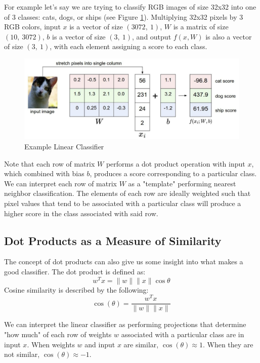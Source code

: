 \documentclass[twoside]{article}
\begin{document}
For example let's say we are trying to classify RGB images of size 32x32 into one of 3 classes: cats, dogs, or ships (see Figure \ref{fig:cat_classifier}). Multiplying 32x32 pixels by 3 RGB colors, input $x$ is a vector of size $(3072,\ 1)$, $W$ is a matrix of size $(10,\ 3072)$, $b$ is a vector of size $(3,\ 1)$, and output $f(x, W)$ is also a vector of size $(3,\ 1)$, with each element assigning a score to each class.

\begin{figure}[!ht]%
    \centering
    \includegraphics[width=14cm]{cat_classifier}
    \caption{Example Linear Classifier}
    \label{fig:cat_classifier}%
\end{figure}

Note that each row of matrix $W$ performs a dot product operation with input $x$, which combined with bias $b$, produces a score corresponding to a particular class. We can interpret each row of matrix $W$ as a "template" performing nearest neighbor classification. The elements of each row are ideally weighted such that pixel values that tend to be associated with a particular class will produce a higher score in the class associated with said row.

\subsection{Dot Products as a Measure of Similarity}

The concept of dot products can also give us some insight into what makes a good classifier.
The dot product is defined as:
$$w^T x = \|w\| \|x\| \cos \theta$$
Cosine similarity is described by the following:
$$\cos(\theta) = \frac{w^Tx}{\| w \| \|x\|} $$

We can interpret the linear classifier as performing projections that determine "how much" of each row of weights $w$ associated with a particular class are in input $x$. When weights $w$ and input $x$ are similar, $\cos(\theta) \approx 1$. When they are not similar, $\cos(\theta) \approx -1$.
\end{document}

